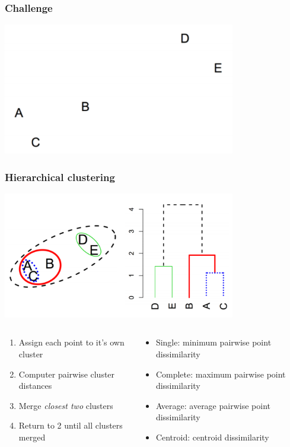 \documentclass[xcolor={dvipsnames}]{beamer}
\begin{document}
\frame
{
 \frametitle{Challenge}

\includegraphics[width=4in]{stuffs/hier1.png}
}



\frame
{
 \frametitle{Hierarchical clustering }

\includegraphics[width=4in]{stuffs/hier2.png}


\begin{columns}
\scriptsize
\begin{column}{.5\textwidth}

\begin{enumerate}
\item Assign each point to it's own cluster
\item<2-> Computer pairwise cluster distances
\item<3-> Merge \emph{closest two} clusters
\item<4-> Return to 2 until all clusters merged
\end{enumerate}
\end{column}
\begin{column}{.7\textwidth}
\begin{itemize}
\setlength\itemsep{.5em}
\item<5> Single:  minimum pairwise point dissimilarity 
\item<5> Complete: maximum pairwise point dissimilarity 
\item<5> Average:  average pairwise point dissimilarity 
\item<5> Centroid:  centroid dissimilarity 
\end{itemize}


\end{column}
\end{columns}}
\end{document}
